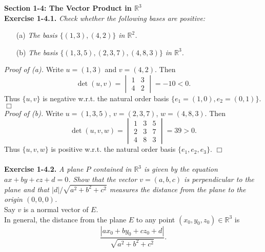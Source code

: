 \documentclass{article}
\begin{document}
\textbf{\large Section 1-4: The Vector Product in $\mathbb{R}^{3}$} \\



\textbf{Exercise 1-4.1.}
\emph{Check whether the following bases are positive:}
\begin{enumerate}
  \item[(a)]
  \emph{The basis $\{(1,3), (4,2)\}$ in $\mathbb{R}^2$.}
  \item[(b)]
  \emph{The basis $\{(1,3,5), (2,3,7), (4,8,3)\}$ in $\mathbb{R}^3$.} \\
\end{enumerate}

\emph{Proof of (a).}
Write $u = (1,3)$ and $v = (4,2)$.
Then
$$\det(u,v)
= \begin{vmatrix}
  1 & 3 \\
  4 & 2
  \end{vmatrix}
= -10 < 0.$$
Thus $\{u,v\}$ is negative w.r.t. the natural order basis $\{ e_1 = (1,0), e_2 = (0,1) \}$.
$\Box$ \\

\emph{Proof of (b).}
Write $u = (1,3,5)$, $v = (2,3,7)$, $w = (4,8,3)$.
Then
$$\det(u,v,w)
= \begin{vmatrix}
  1 & 3 & 5 \\
  2 & 3 & 7 \\
  4 & 8 & 3
  \end{vmatrix}
= 39 > 0.$$
Thus $\{u,v,w\}$ is positive w.r.t. the natural order basis $\{ e_1, e_2, e_3 \}$.
$\Box$ \\\\






\textbf{Exercise 1-4.2.}
\emph{A plane $P$ contained in $\mathbb{R}^3$ is given by the equation
$ax+by+cz+d=0$.
Show that the vector $v=(a,b,c)$ is perpendicular to the plane and that
$|d|/\sqrt{a^2+b^2+c^2}$ measures the distance from the plane to the origin $(0,0,0)$.} \\

Say $v$ is a normal vector of $E$. \\

In general, the distance from the plane $E$ to
any point $(x_0, y_0, z_0) \in \mathbb{R}^3$ is
$$\frac{|ax_0+by_0+cz_0+d|}{\sqrt{a^2+b^2+c^2}}.$$
\end{document}
